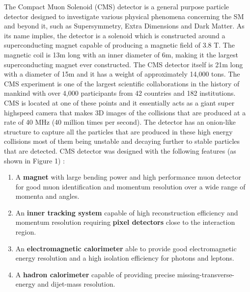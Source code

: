 
The Compact Muon Solenoid (CMS) detector is a general purpose particle detector designed to investigate various physical phenomena concerning the SM and beyond it, such as Supersymmetry, Extra Dimensions and Dark Matter. As its name implies, the detector is a solenoid which is  constructed around a superconducting magnet capable of producing a magnetic field of 3.8 T. The magnetic coil is 13m long with an inner diameter of 6m, making it the largest superconducting magnet ever constructed. The CMS detector itself is 21m long with a diameter of 15m and it has a weight of approximately 14,000 tons. The CMS experiment is one of the largest scientific collaborations in the history of mankind with over 4,000 participants from 42 countries and 182 institutions. CMS is located at one of these points and it essentially acts as a giant super highspeed camera that makes 3D images of the collisions that are produced at a rate of 40 MHz (40 million times per second). The detector has an onion-like structure to capture all the particles that are produced in these high energy collisions most of them being unstable and decaying further to stable particles that are detected.  CMS detector was designed with the following features (as shown in Figure 1) :

\begin{enumerate}
	\item{A \textbf{magnet} with large bending power and high performance muon detector for good muon
identification and momentum resolution over a wide range of momenta and angles.}

	\item{An \textbf{inner tracking system} capable of high reconstruction efficiency and momentum resolution
requiring \textbf{pixel detectors} close to the interaction region.}

	\item{An \textbf{electromagnetic calorimeter} able to provide good electromagnetic energy resolution and  
a high isolation efficiency for photons and leptons.}

	\item{A \textbf{hadron calorimeter} capable of providing precise missing-transverse-energy and dijet-mass  
resolution.}

\end{enumerate}


